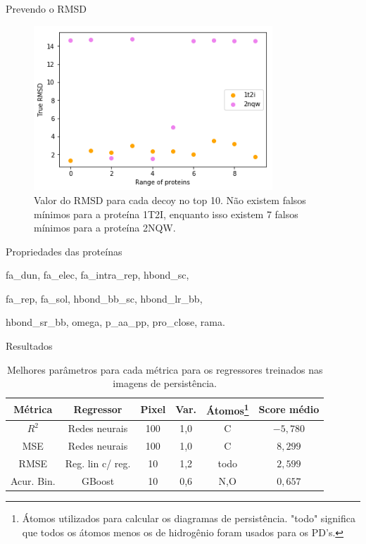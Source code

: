 \documentclass[10pt]{beamer}
\begin{document}
\begin{frame}{Prevendo o RMSD}
    \begin{figure}
    \centering
    \includegraphics[width=0.8\textwidth]{../images/relatorio/true_rmsd.png}
    \caption{Valor do RMSD para cada decoy no top 10. Não existem falsos mínimos para a proteína 1T2I, enquanto
    isso existem 7 falsos mínimos para a proteína 2NQW.}
    \label{fig:truermsd}
\end{figure}
\end{frame}

\begin{frame}{Propriedades das proteínas}
\begin{center}
    fa\_dun, fa\_elec, fa\_intra\_rep, hbond\_sc,

    fa\_rep, fa\_sol, hbond\_bb\_sc, hbond\_lr\_bb,

    hbond\_sr\_bb, omega, p\_aa\_pp, pro\_close, rama.
\end{center} 
\end{frame}

\begin{frame}{Resultados}
    \begin{table}[!htbp]
     \centering
     \caption{Melhores parâmetros para cada métrica para os regressores treinados nas imagens de persistência.}
     \label{tab:bestruns}
     \begin{tabular}{@{}cccccc@{}}
     \toprule
     \textbf{Métrica} & \textbf{Regressor} & \textbf{Pixel} & \textbf{Var.} &
     \textbf{Átomos}\footnote{Átomos utilizados para calcular os diagramas de persistência. "todo" significa
     que todos os átomos menos os de hidrogênio foram usados para os PD's.}
      & Score médio
     \\
     \midrule
     $R^2$           & Redes neurais     & 100       & 1,0             & C     & $-5,780$ \\
     MSE             & Redes neurais     & 100       & 1,0             & C     &  $8,299$  \\
     RMSE            & Reg. lin c/ reg.   & 10    & 1,2           & todo  &  $2,599$  \\
         Acur. Bin. & GBoost             & 10      & 0,6             & N,O   &  $0,657$  \\
     \bottomrule
     \end{tabular}
\end{table}
\end{frame}
\end{document}
